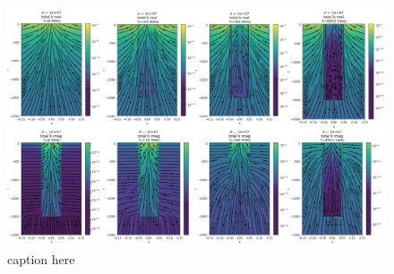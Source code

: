 \begin{figure}[htb]
    \begin{center}
    \includegraphics[width=\columnwidth]{figures/magnetic_flux_density_sigma.png}
    \end{center}
\caption{caption here}
\label{fig:magnetic_flux_density_sigma}
\end{figure}

